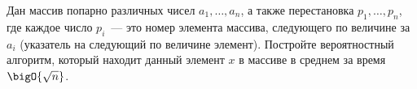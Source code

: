 Дан массив попарно различных чисел $a_1, \dots, a_n$, а также перестановка $p_1, \dots, p_n$, где каждое
число $p_i$~--- это номер элемента массива, следующего по величине за $a_i$ (указатель на следующий по
величине элемент). Постройте вероятностный алгоритм, который находит данный элемент $x$ в массиве в
среднем за время $\bigO{\sqrt{n}}$.